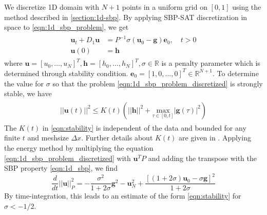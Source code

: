 We discretize 1D domain with $N+1$ points in a uniform grid on $[0,1]$ using the method described in \autoref{section:1d-sbp}. By applying SBP-SAT discretization in space to \autoref{eqn:1d_sbp_problem}, we get
\begin{align}
    \begin{split}
        \boldsymbol{u}_t + D_1\boldsymbol{u} &= P^{-1}\sigma(\boldsymbol{u}_0 - \boldsymbol{g}) \boldsymbol{e}_0, \quad t > 0\\
        \boldsymbol{u}(0) &= \boldsymbol{h}
    \end{split}
    \label{eqn:1d_sbp_problem_discretized}
\end{align}
where $\boldsymbol{u} = [u_0,\dots,u_N]^T, \boldsymbol{h} = [h_0,\dots,h_N]^T, \sigma \in \mathbb{R}$ is a penalty parameter which is determined through stability condition. $\boldsymbol{e}_0 = [1,0,\dots,0]^T\in\mathbb{R}^{N+1}$. To determine the value for $\sigma$ so that the problem \autoref{eqn:1d_sbp_problem_discretized} is strongly stable, we have 
\begin{align}
    \begin{split}
        ||\boldsymbol{u}(t)||^2 \leq K(t)(||\boldsymbol{h}||^2 + \underset{\tau \in [0,t]}{\text{max}}|\boldsymbol{g}(\tau)|^2)
    \end{split}
    \label{eqn:stability}
\end{align}
The $K(t)$ in \autoref{eqn:stability} is independent of the data and bounded for any finite $t$ and meshsize $\Delta x$. Further details about $K(t)$ are given in \cite{SVARD201417,gustafsson1995time}.
Applying the energy method by multiplying the equation \autoref{eqn:1d_sbp_problem_discretized} with $\boldsymbol{u}^TP$ and adding the transpose with the SBP property \autoref{eqn:1d_sbp}, we find
\begin{equation}
    \frac{d}{dt}||\boldsymbol{u}||_P^2 = - \frac{\sigma^2}{1+2\sigma}\boldsymbol{g}^2 - \boldsymbol{u}_N^2 + \frac{[(1+2\sigma)\boldsymbol{u}_0 - \sigma\boldsymbol{g}]^2}{1+2\sigma}
\end{equation}
By time-integration, this leads to an estimate of the form \autoref{eqn:stability} for $\sigma < -1/2$.

